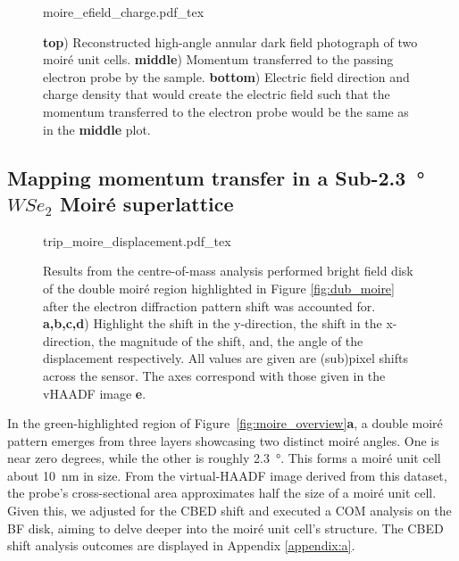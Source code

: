 \begin{figure}
    \centering
    \def\svgwidth{.5\linewidth}
    {moire_efield_charge.pdf_tex}
    \caption{\textbf{top}) Reconstructed high-angle annular dark field photograph of two moiré unit cells. \textbf{middle}) Momentum transferred to the passing electron probe by the sample. \textbf{bottom}) Electric field direction and charge density that would create the electric field such that the momentum transferred to the electron probe would be the same as in the \textbf{middle} plot.}
    \label{fig:m_mom}
\end{figure}

\subsection{Mapping momentum transfer in a Sub-\SI{2.3}{\degree} $WSe_2$ Moiré superlattice}
\label{sec:large_moire}
\begin{figure}
    \centering
    \def\svgwidth{.95\linewidth}
    {trip_moire_displacement.pdf_tex}
    \caption{Results from the centre-of-mass analysis performed bright field disk of the double moiré region highlighted in Figure \ref{fig:dub_moire} after the electron diffraction pattern shift was accounted for. \textbf{a,b,c,d}) Highlight the shift in the y-direction, the shift in the x-direction, the magnitude of the shift, and, the angle of the displacement respectively. All values are given are (sub)pixel shifts across the sensor. The axes correspond with those given in the vHAADF image \textbf{e}.}
    \label{fig:trip_m_dis}
\end{figure}

In the green-highlighted region of Figure~\ref{fig:moire_overview}\textbf{a}, a double moiré pattern emerges from three layers showcasing two distinct moiré angles.
%
One is near zero degrees, while the other is roughly \SI{2.3}{\degree}.
%
This forms a moiré unit cell about \SI{10}{\nano\meter} in size. 
%
From the virtual-HAADF image derived from this dataset, the probe's cross-sectional area approximates half the size of a moiré unit cell. 
%
Given this, we adjusted for the CBED shift and executed a COM analysis on the BF disk, aiming to delve deeper into the moiré unit cell's structure. 
%
The CBED shift analysis outcomes are displayed in Appendix \ref{appendix:a}.


